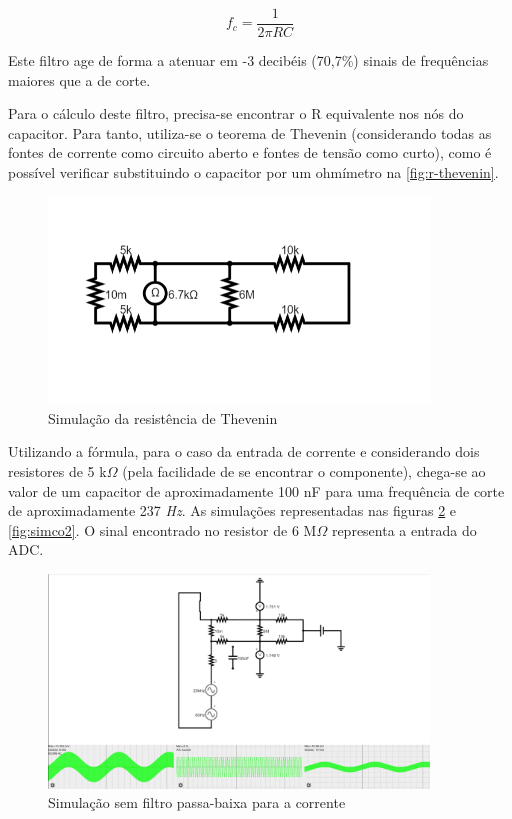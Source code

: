 \begin{equation}
    \label{eqcap}
    f_{c} = \frac{1}{2\pi RC}
\end{equation}

Este filtro age de forma a atenuar em -3 decibéis (70,7\%) sinais de frequências maiores que a de corte.

Para o cálculo deste filtro, precisa-se encontrar o R equivalente nos nós do capacitor. Para tanto, utiliza-se o teorema de Thevenin (considerando todas as fontes de corrente como circuito aberto e fontes de tensão como curto), como é possível verificar substituindo o capacitor por um ohmímetro na \autoref{fig:r-thevenin}.

\begin{figure}[htb!]
    \caption{Simulação da resistência de Thevenin}
    \label{fig:r-thevenin}
    \includegraphics[width=0.9\textwidth]{figuras/r-thevenin.png}
    \fonte{}
\end{figure}

Utilizando a fórmula, para o caso da entrada de corrente e considerando dois resistores de 5 k$\Omega$ (pela facilidade de se encontrar o componente), chega-se ao valor de um capacitor de aproximadamente 100 nF para uma frequência de corte de aproximadamente 237 \textit{Hz}. As simulações representadas nas figuras \ref{fig:simco1} e \ref{fig:simco2}. O sinal encontrado no resistor de 6 M$\Omega$ representa a entrada do \gls{ADC}.

\begin{figure}[htb!]
    \caption{Simulação sem filtro passa-baixa para a corrente}
    \label{fig:simco1}
    \includegraphics[width=0.9\textwidth]{figuras/sim-co-1.png}
    \fonte{}
\end{figure}

